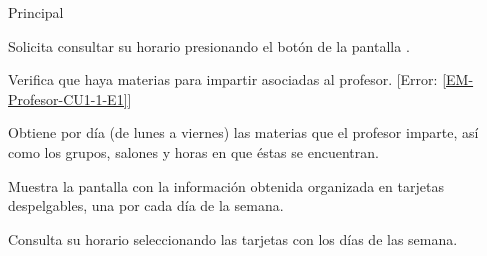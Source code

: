 \begin{UCtrayectoria}{Principal}
	
	\UCpaso [\UCactor] Solicita consultar su horario presionando el botón  de la pantalla .

	\UCpaso Verifica que haya materias para impartir asociadas al profesor. [Error: \ref{EM-Profesor-CU1-1-E1}]

	\UCpaso Obtiene por día (de lunes a viernes) las materias que el profesor imparte, así como los grupos, salones y horas en que éstas se encuentran. 

	\UCpaso Muestra la pantalla  con la información obtenida organizada en tarjetas despelgables, una por cada día de la semana.

	\UCpaso[\UCactor] Consulta su horario seleccionando las tarjetas con los días de las semana.

\end{UCtrayectoria}
